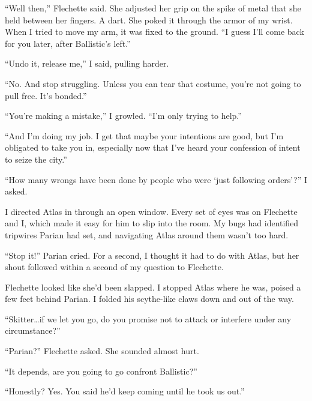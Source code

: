 ``Well then,'' Flechette said.  She adjusted her grip on the spike of metal that she held between her fingers.  A dart.  She poked it through the armor of my wrist.  When I tried to move my arm, it was fixed to the ground.  ``I guess I'll come back for you later, after Ballistic's left.''



``Undo it, release me,'' I said, pulling harder.



``No.  And stop struggling.  Unless you can tear that costume, you're not going to pull free.  It's bonded.''



``You're making a mistake,'' I growled.  ``I'm only trying to help.''



``And I'm doing my job.  I get that maybe your intentions are good, but I'm obligated to take you in, especially now that I've heard your confession of intent to seize the city.''



``How many wrongs have been done by people who were `just following orders'?'' I asked.



I directed Atlas in through an open window.  Every set of eyes was on Flechette and I, which made it easy for him to slip into the room.  My bugs had identified tripwires Parian had set, and navigating Atlas around them wasn't too hard.



``Stop it!''  Parian cried.  For a second, I thought it had to do with Atlas, but her shout followed within a second of my question to Flechette.



Flechette looked like she'd been slapped.  I stopped Atlas where he was, poised a few feet behind Parian.  I folded his scythe-like claws down and out of the way.



``Skitter\ldots if we let you go, do you promise not to attack or interfere under any circumstance?''



``Parian?''  Flechette asked.  She sounded almost hurt.



``It depends, are you going to go confront Ballistic?''



``Honestly?  Yes.  You said he'd keep coming until he took us out.''



